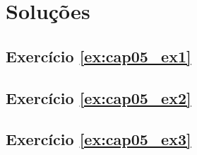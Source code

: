 \section*{Soluções}

\subsection*{Exercício \ref{ex:cap05_ex1} }



\subsection*{Exercício \ref{ex:cap05_ex2} }



\subsection*{Exercício \ref{ex:cap05_ex3} }

